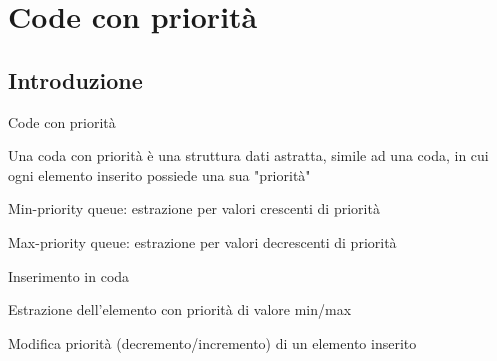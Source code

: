 \section{Code con priorità}
\subsection{Introduzione}

\begin{frame}{Code con priorità}

\begin{myboxtitle}
Una \alert{coda con priorità} è una struttura dati astratta, simile ad 
una coda, in cui ogni elemento inserito possiede una sua "\alert{priorità}"
\small
\BIL
\item \alert{Min-priority queue}: estrazione per valori crescenti di priorità
\item \alert{Max-priority queue}: estrazione per valori decrescenti di priorità
\EIL
\end{myboxtitle}

\begin{myboxtitle}
\BIL
\item Inserimento in coda
\item Estrazione dell'elemento con priorità di valore min/max
\item Modifica priorità (decremento/incremento) di un elemento inserito
\EIL
\end{myboxtitle}

\end{frame}

